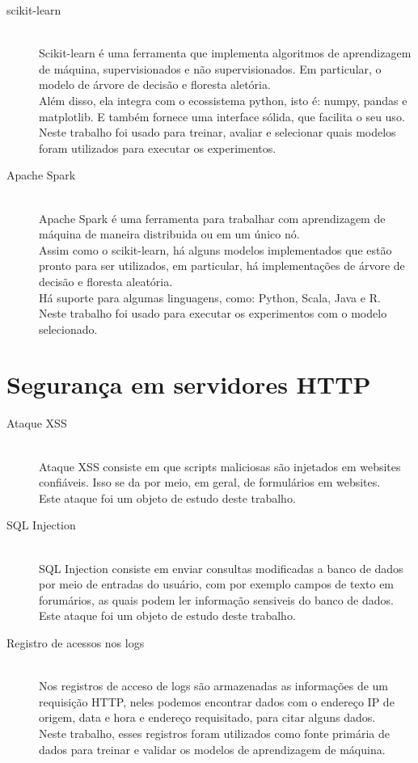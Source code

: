 \begin{description}
    \item[scikit-learn] \hfill \\ Scikit-learn é uma ferramenta que implementa algoritmos de aprendizagem
    de máquina, supervisionados e não supervisionados. Em particular, o modelo de árvore de decisão e floresta
    aletória.\\ 
    Além disso, ela integra com o ecossistema python, isto é: numpy, pandas e matplotlib. E também 
    fornece uma interface sólida, que facilita o seu uso.  \\
    Neste trabalho foi usado para treinar, avaliar e selecionar quais modelos foram utilizados 
    para executar os experimentos.

    \item[Apache Spark] \hfill \\ Apache Spark é uma ferramenta para trabalhar com aprendizagem 
    de máquina de maneira distribuida ou em um único nó. \\
    Assim como o scikit-learn, há alguns modelos implementados que estão pronto para ser utilizados, 
    em particular, há implementações de árvore de decisão e floresta aleatória. \\
    Há suporte para algumas linguagens, como: Python, Scala, Java e R. \\
    Neste trabalho foi usado para executar os experimentos com o modelo selecionado.
\end{description}

\section{Segurança em servidores HTTP}

\begin{description}
    \item[Ataque XSS] \hfill \\ Ataque XSS consiste em que scripts maliciosas são injetados em 
    websites confiáveis. Isso se da por meio, em geral, de formulários em websites. \\ 
    Este ataque foi um objeto de estudo deste trabalho.
    \item[SQL Injection] \hfill \\ SQL Injection consiste em enviar consultas modificadas a banco 
    de dados por meio de entradas do usuário, com por exemplo campos de texto em forumários, as quais 
    podem ler informação sensiveis do banco de dados. \\   
    Este ataque foi um objeto de estudo deste trabalho.
    \item[Registro de acessos nos logs] \hfill \\ Nos registros de acceso de logs são armazenadas as
    informações de um requisição HTTP, neles podemos encontrar dados com o endereço IP de origem,
    data e hora e endereço requisitado, para citar alguns dados.  \\
    Neste trabalho, esses registros foram utilizados como fonte primária de dados para treinar 
    e validar os modelos de aprendizagem de máquina.
\end{description}


